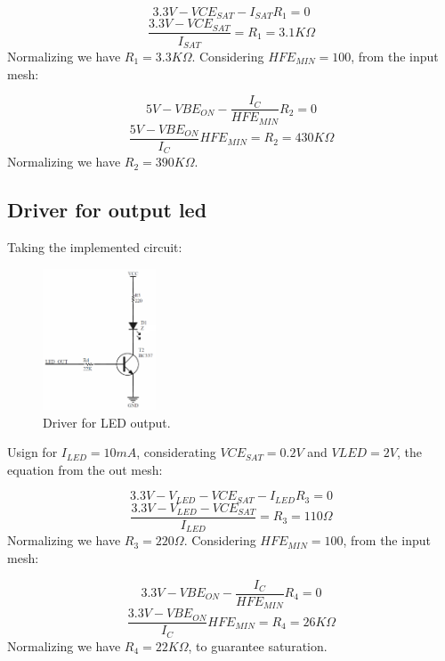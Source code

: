 $$3.3V - VCE_{SAT} - I_{SAT}R_1 = 0$$
$$\frac{3.3V - VCE_{SAT}}{I_{SAT}} = R_1 = 3.1K\Omega$$
Normalizing we have $R_1 = 3.3K\Omega$.
Considering $HFE_{MIN} = 100$, from the input mesh:

$$5V - VBE_{ON} - \frac{I_C}{HFE_{MIN}}R_2 = 0$$
$$\frac{5V - VBE_{ON}}{I_C}HFE_{MIN} = R_2 = 430K\Omega$$
Normalizing we have $R_2 = 390K\Omega$.

\subsection*{Driver for output led}
Taking the implemented circuit:

\begin{figure}[H]
    \begin{centering}
    \includegraphics[width=0.3\textwidth]{Graficos3/LED_Driver.png}
    \par\end{centering}
    \caption{Driver for LED output.}
\end{figure}

Usign for $I_{LED} = 10mA$, considerating $VCE_{SAT} = 0.2V$ 
and $V{LED} = 2V$, the equation from the out mesh:

$$3.3V - V_{LED} - VCE_{SAT} - I_{LED}R_3 = 0$$
$$\frac{3.3V - V_{LED} - VCE_{SAT}}{I_{LED}} = R_3 = 110\Omega$$
Normalizing we have $R_3 = 220\Omega$.
Considering $HFE_{MIN} = 100$, from the input mesh:

$$3.3V - VBE_{ON} - \frac{I_C}{HFE_{MIN}}R_4 = 0$$
$$\frac{3.3V - VBE_{ON}}{I_C}HFE_{MIN} = R_4 = 26K\Omega$$
Normalizing we have $R_4 = 22K\Omega$, to guarantee saturation.

